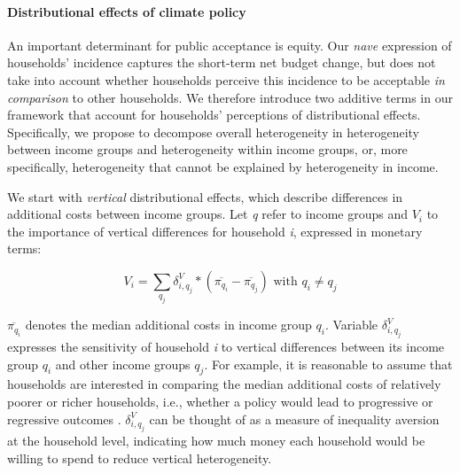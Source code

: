 \documentclass[12pt, a4paper]{article}
\begin{document}
\paragraph{Distributional effects of climate policy}
An important determinant for public acceptance is equity. Our \textit{nave} expression of households' incidence captures the short-term net budget change, but does not take into account whether households perceive this incidence to be acceptable \textit{in comparison} to other households. We therefore introduce two additive terms in our framework that account for households' perceptions of distributional effects. Specifically, we propose to decompose overall heterogeneity in heterogeneity between income groups and heterogeneity within income groups, or, more specifically, heterogeneity that cannot be explained by heterogeneity in income.

We start with \textit{vertical} distributional effects, which describe differences in additional costs between income groups. Let \textit{q} refer to income groups and $V_{i}$ to the importance of vertical differences for household \textit{i}, expressed in monetary terms:

\begin{equation}\label{eq_V}
    V_{i} = \sum_{q_{j}} \delta_{i,q_{j}}^{V} * (\overline{\pi_{q_{i}}}-\overline{\pi_{q_{j}}}) \text{ with } q_{i} \neq q_{j}  
\end{equation}

$\overline{\pi_{q_{i}}}$ denotes the median additional costs in income group $q_{i}$. Variable $\delta_{i,q_{j}}^{V}$ expresses the sensitivity of household \textit{i} to vertical differences between its income group $q_{i}$ and other income groups $q_{j}$. For example, it is reasonable to assume that households are interested in comparing the median additional costs of relatively poorer or richer households, i.e., whether a policy would lead to progressive or regressive outcomes \autocite[e.g.,][]{Dechezlepretre.2025}. $\delta_{i,q_{j}}^{V}$ can be thought of as a measure of inequality aversion at the household level, indicating how much money each household would be willing to spend to reduce vertical heterogeneity.
\end{document}
